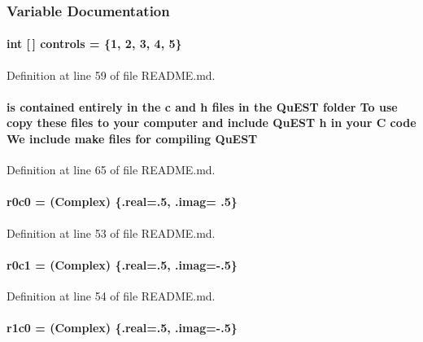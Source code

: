 \subsubsection{Variable Documentation}
\hypertarget{README_8md_a636f16bb55903420974dfd184205e591}{
\paragraph[{controls}]{\setlength{\rightskip}{0pt plus 5cm}int \mbox{[}$\,$\mbox{]} {\bf controls} = \{1, 2, 3, 4, 5\}}\hfill}
\label{README_8md_a636f16bb55903420974dfd184205e591}


Definition at line 59 of file README.md.\hypertarget{README_8md_a2d0f5bba181ef1543dc90d4f1ce64c5e}{
\paragraph[{QuEST}]{ is contained entirely in the c and h files in the {\bf QuEST} folder To use copy these files to your computer and include {\bf QuEST} h in your C code We include make files for compiling {\bf QuEST}}\hfill}
\label{README_8md_a2d0f5bba181ef1543dc90d4f1ce64c5e}


Definition at line 65 of file README.md.\hypertarget{README_8md_a28c529de4915322d2a51f2c1a424c672}{
\paragraph[{r0c0}]{ {\bf r0c0} = ({\bf Complex}) \{.real=.5, .imag= .5\}}\hfill}
\label{README_8md_a28c529de4915322d2a51f2c1a424c672}


Definition at line 53 of file README.md.\hypertarget{README_8md_a444db2ee26ed224e9370770814cb4b50}{
\paragraph[{r0c1}]{ {\bf r0c1} = ({\bf Complex}) \{.real=.5, .imag=-\/.5\}}\hfill}
\label{README_8md_a444db2ee26ed224e9370770814cb4b50}


Definition at line 54 of file README.md.\hypertarget{README_8md_a698aa54017453fbfbf429e0e46821ef8}{
\paragraph[{r1c0}]{ {\bf r1c0} = ({\bf Complex}) \{.real=.5, .imag=-\/.5\}}\hfill}
\label{README_8md_a698aa54017453fbfbf429e0e46821ef8}


